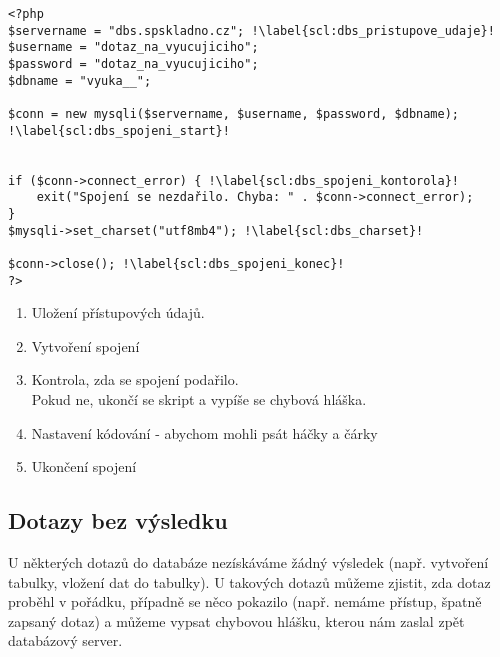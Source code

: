 \begin{minipage}[t]{.45\textwidth}
\begin{code}
\begin{verbatim}
<?php
$servername = "dbs.spskladno.cz"; !\label{scl:dbs_pristupove_udaje}!
$username = "dotaz_na_vyucujiciho";
$password = "dotaz_na_vyucujiciho";
$dbname = "vyuka__";

$conn = new mysqli($servername, $username, $password, $dbname); !\label{scl:dbs_spojeni_start}!


if ($conn->connect_error) { !\label{scl:dbs_spojeni_kontorola}!
    exit("Spojení se nezdařilo. Chyba: " . $conn->connect_error);
}
$mysqli->set_charset("utf8mb4"); !\label{scl:dbs_charset}!

$conn->close(); !\label{scl:dbs_spojeni_konec}!
?> 
\end{verbatim}

\label{code:php_dbs_spojeni}
\end{code}
\end{minipage}
\begin{minipage}[t]{.45\textwidth}
\begin{enumerate}
\item[ř. \ref{scl:dbs_pristupove_udaje}:] Uložení přístupových údajů.
\item[ř. \ref{scl:dbs_spojeni_start}:] Vytvoření spojení 
\item[ř. \ref{scl:dbs_spojeni_kontorola}:] Kontrola, zda se spojení podařilo.\\
Pokud ne, ukončí se skript a vypíše se chybová hláška.
\vspace{2cm}
\item[ř. \ref{scl:dbs_charset}:] Nastavení kódování - abychom mohli psát háčky a čárky
\item[ř. \ref{scl:dbs_spojeni_konec}:] Ukončení spojení 
\end{enumerate}
\end{minipage} 

\subsection{Dotazy bez výsledku}
U některých dotazů do databáze nezískáváme žádný výsledek (např. vytvoření tabulky, vložení dat do tabulky). U takových dotazů můžeme zjistit, zda dotaz proběhl v pořádku, případně se něco pokazilo (např. nemáme přístup, špatně zapsaný dotaz) a můžeme vypsat chybovou hlášku, kterou nám zaslal zpět databázový server.\\

